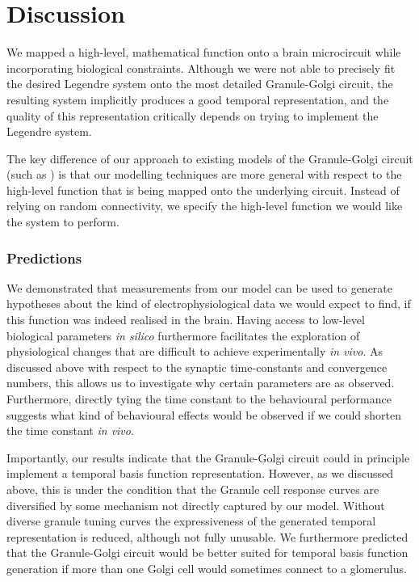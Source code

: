 
\section{Discussion}

We mapped a high-level, mathematical function onto a brain microcircuit while incorporating biological constraints.
Although we were not able to precisely fit the desired Legendre system onto the most detailed Granule-Golgi circuit, the resulting system implicitly produces a good temporal representation, and the quality of this representation critically depends on trying to implement the Legendre system.

The key difference of our approach to existing models of the Granule-Golgi circuit (such as \cite{rossert2015edge}) is that our modelling techniques are more general with respect to the high-level function that is being mapped onto the underlying circuit.
Instead of relying on random connectivity, we specify the high-level function we would like the system to perform.

\subsubsection{Predictions}
We demonstrated that measurements from our model can be used to generate hypotheses about the kind of electrophysiological data we would expect to find, if this function was indeed realised in the brain.
Having access to low-level biological parameters \emph{in silico} furthermore facilitates the exploration of physiological changes that are difficult to achieve experimentally \emph{in vivo}.
As discussed above with respect to the synaptic time-constants and convergence numbers, this allows us to investigate why certain parameters are as observed.
Furthermore, directly tying the time constant to the behavioural performance suggests what kind of behavioural effects would be observed if we could shorten the time constant \emph{in vivo}.

Importantly, our results indicate that the Granule-Golgi circuit could in principle implement a temporal basis function representation.
However, as we discussed above, this is under the condition that the Granule cell response curves are diversified by some mechanism not directly captured by our model.
Without diverse granule tuning curves the expressiveness of the generated temporal representation is reduced, although not fully unusable.
We furthermore predicted that the Granule-Golgi circuit would be better suited for temporal basis function generation if more than one Golgi cell would sometimes connect to a glomerulus.

